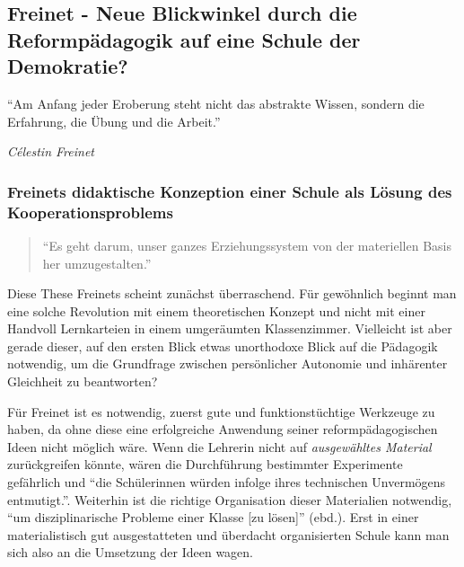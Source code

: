 \subsection{Freinet - Neue Blickwinkel durch die Reformpädagogik auf eine Schule der Demokratie?}

	\epigraph{
		``Am Anfang jeder Eroberung steht nicht das abstrakte Wissen, sondern die Erfahrung, die Übung und die Arbeit.''}
	{
		\emph{Célestin Freinet}
	}

\subsubsection{Freinets didaktische Konzeption einer Schule als Lösung des Kooperationsproblems}

	\begin{quote} ``Es geht darum, unser ganzes Erziehungssystem von der materiellen Basis her umzugestalten.''
		\cite[S.~99]{Freinet1979}
	\end{quote}

Diese These Freinets scheint zunächst überraschend.
Für gewöhnlich beginnt man eine solche Revolution mit einem theoretischen Konzept und nicht mit einer Handvoll Lernkarteien in einem umgeräumten Klassenzimmer.
Vielleicht ist aber gerade dieser, auf den ersten Blick etwas unorthodoxe Blick auf die Pädagogik notwendig, um die Grundfrage zwischen persönlicher Autonomie und inhärenter Gleichheit zu beantworten?

Für Freinet ist es notwendig, zuerst gute und funktionstüchtige Werkzeuge zu haben, da ohne diese eine erfolgreiche Anwendung seiner reformpädagogischen Ideen nicht möglich wäre.
Wenn die Lehrerin nicht auf \emph{ausgewähltes Material} zurückgreifen könnte, wären die Durchführung bestimmter Experimente gefährlich und ``die Schülerinnen würden infolge ihres technischen Unvermögens entmutigt.''\parencite[S.~98]{Freinet1979}.
Weiterhin ist die richtige Organisation dieser Materialien notwendig, ``um disziplinarische Probleme einer Klasse [zu lösen]'' (ebd.).
Erst in einer materialistisch gut ausgestatteten und überdacht organisierten Schule kann man sich also an die Umsetzung der Ideen wagen.

